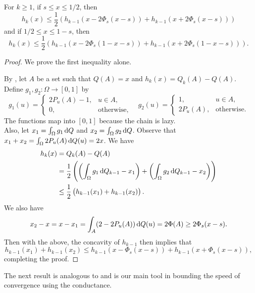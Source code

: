 \begin{theorem}
For $k\geq 1$, if $s\leq x\leq 1/2$, then
\[ h_k(x) \leq \frac{1}{2} \left(h_{k-1}(x-2\Phi_s(x-s)) + h_{k-1}(x+2\Phi_s(x-s))\right) \]
and if $1/2 \leq x\leq 1-s$, then
\[ h_k(x) \leq \frac{1}{2} \left(h_{k-1}(x-2\Phi_s(1-x-s)) + h_{k-1}(x+2\Phi_s(1-x-s))\right). \]
\end{theorem}
\begin{proof}
We prove the first inequality alone.

By , let $A$ be a set such that $Q(A)=x$ and $h_k(x)=Q_k(A)-Q(A)$. Define $g_1,g_2:\Omega\to[0,1]$ by
\[ g_1(u) = 
\begin{cases}
2P_u(A) - 1, & u\in A, \\
0, & \text{otherwise,}
\end{cases}
\quad
g_2(u) = 
\begin{cases}
1, & u\in A, \\
2P_u(A), & \text{otherwise.}
\end{cases}
\]
The functions map into $[0,1]$ because the chain is lazy.\\
Also, let $x_1 = \int_\Omega g_1\operatorname{d}\!{Q}$ and $x_2 = \int_\Omega g_2\operatorname{d}\!{Q}$. Observe that $x_1 + x_2 = \int_\Omega 2P_u(A)\operatorname{d}\!{Q}(u) = 2x$. We have
\begin{align*}
	h_k(x) &= Q_k(A) - Q(A) \\
	&= \frac{1}{2} \left( \left(\int_\Omega g_1\operatorname{d}\!{Q}_{k-1} - x_1\right) + \left( \int_\Omega g_2\operatorname{d}\!{Q}_{k-1} - x_2 \right) \right) \\
	&\leq \frac{1}{2} \left( h_{k-1}(x_1) + h_{k-1}(x_2) \right).
\end{align*}
We also have
\[ x_2-x = x-x_1 = \int_A (2-2P_u(A))\operatorname{d}\!{Q}(u) = 2\Phi(A) \geq 2\Phi_s(x-s). \]
Then with the above, the concavity of $h_{k-1}$ then implies that
\[ h_{k-1}(x_1)+h_{k-1}(x_2) \leq h_{k-1}(x - \Phi_s(x-s)) + h_{k-1}(x+\Phi_s(x-s)), \]
completing the proof.
\end{proof}

The next result is analogous to  and is our main tool in bounding the speed of convergence using the conductance.

